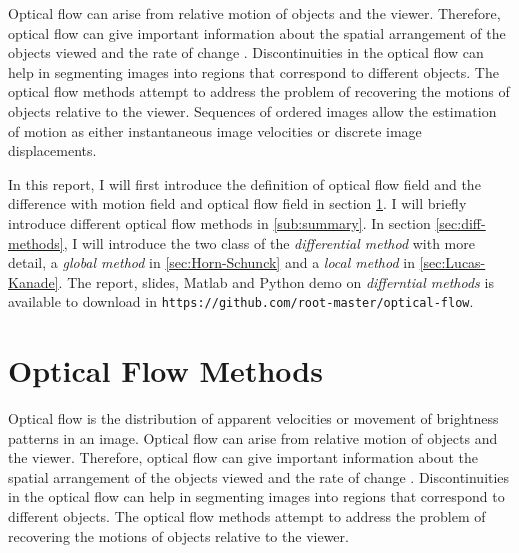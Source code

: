 \documentclass[letterpaper,11pt]{article}
\begin{document}
Optical flow can arise from relative motion of objects and the viewer. Therefore, optical flow can give important information about the spatial arrangement of the objects viewed and the rate of change \citep{Horn:Schunck:1981}.  Discontinuities in the optical flow can help in segmenting images into regions that correspond to different objects. The optical flow methods attempt to address the problem of recovering the motions of objects relative to the viewer. Sequences of ordered images allow the estimation of motion as either instantaneous image velocities or discrete image displacements. 

In this report, I will first introduce the definition of optical flow field and the difference with motion field and optical flow field in section \ref{sec:optical-flow}. I will briefly introduce different optical flow methods in \ref{sub:summary}. In section \ref{sec:diff-methods}, I will introduce the two class of the \emph{differential method} with more detail, a \emph{global method} in \ref{sec:Horn-Schunck} and a \emph{local method} in \ref{sec:Lucas-Kanade}. The report, slides, Matlab and Python demo on \emph{differntial methods} is available to download in \texttt{https://github.com/root-master/optical-flow}.

\section{Optical Flow Methods}
\label{sec:optical-flow}
Optical flow is the distribution of apparent velocities or movement of brightness patterns in an image. Optical flow can arise from relative motion of objects and the viewer. Therefore, optical flow can give important information about the spatial arrangement of the objects viewed and the rate of change \citep{Horn:Schunck:1981}. Discontinuities in the optical flow can help in segmenting images into regions that correspond to different objects. The optical flow methods attempt to address the problem of recovering the motions of objects relative to the viewer. 
\end{document}

